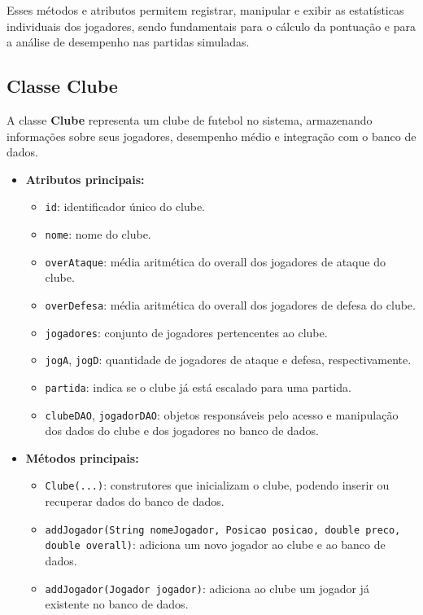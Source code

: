 \documentclass[12pt]{article}
\begin{document}
Esses métodos e atributos permitem registrar, manipular e exibir as estatísticas individuais dos jogadores, sendo fundamentais para o cálculo da pontuação e para a análise de desempenho nas partidas simuladas.

\subsection{Classe Clube}

A classe \textbf{Clube} representa um clube de futebol no sistema, armazenando informações sobre seus jogadores, desempenho médio e integração com o banco de dados.

\begin{itemize}
  \item \textbf{Atributos principais:}
        \begin{itemize}
          \item \texttt{id}: identificador único do clube.
          \item \texttt{nome}: nome do clube.
          \item \texttt{overAtaque}: média aritmética do overall dos jogadores de ataque do clube.
          \item \texttt{overDefesa}: média aritmética do overall dos jogadores de defesa do clube.
          \item \texttt{jogadores}: conjunto de jogadores pertencentes ao clube.
          \item \texttt{jogA}, \texttt{jogD}: quantidade de jogadores de ataque e defesa, respectivamente.
          \item \texttt{partida}: indica se o clube já está escalado para uma partida.
          \item \texttt{clubeDAO}, \texttt{jogadorDAO}: objetos responsáveis pelo acesso e manipulação dos dados do clube e dos jogadores no banco de dados.
        \end{itemize}
  \item \textbf{Métodos principais:}
        \begin{itemize}
          \item \texttt{Clube(...)}: construtores que inicializam o clube, podendo inserir ou recuperar dados do banco de dados.
          \item \texttt{addJogador(String nomeJogador, Posicao posicao, double preco, double overall)}: adiciona um novo jogador ao clube e ao banco de dados.
          \item \texttt{addJogador(Jogador jogador)}: adiciona ao clube um jogador já existente no banco de dados.

\end{itemize}
\end{itemize}
\end{document}
